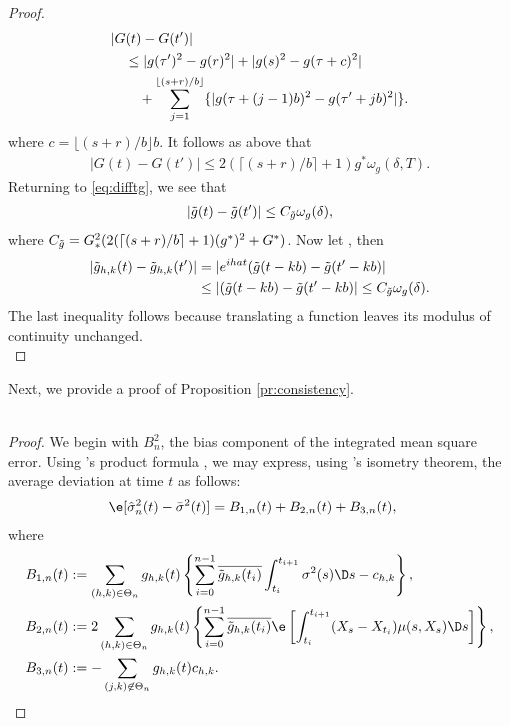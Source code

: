 \begin{appendices}
\begin{proof}
\begin{align}
  &\vert G(t) - G(t') \vert \notag \\
  &\quad \le \vert g(\tau')^2 - g(r)^2\vert +   \vert g(s)^2 - g(\tau + c)^2 \vert\notag \\
  &\qquad +\sum_{j = 1}^{\lfloor (s + r)/b \rfloor} \{\vert g(\tau + (j-1) b)^2 - g(\tau' + j b)^2\vert\}.  \notag
  \label{}
\end{align}
where $c = \lfloor (s + r)/b \rfloor b $. It follows as above that 
\begin{align}
\vert G(t) - G(t') \vert \le 2 (\lceil (s + r)/b\rceil +1)g^*\omega_g(\delta, T).
\end{align}
Returning to \eqref{eq:difftg}, we see that
\begin{align}
  \vert \tilde{g}(t) - \tilde{g}(t')\vert \le C_{\tilde{g}} \omega_g(\delta),\notag
  \label{}
\end{align}
where $C_{\tilde{g}} = G_*^2(2 (\lceil (s + r)/b\rceil +1)(g^*)^2 + G^*)$. Now let \hkints, then
\begin{align}
  \vert \tilde{g}_{h,k}(t) - \tilde{g}_{h,k}(t')\vert & = \vert e^{ihat} (\tilde{g}(t - kb) -\tilde{g}(t'-kb) \vert\notag\\
  &\le \vert (\tilde{g}(t - kb) -\tilde{g}(t'-kb) \vert \le C_{\tilde{g}} \omega_g(\delta).
  \label{}
\end{align}
The last inequality follows because translating a function leaves its modulus of continuity unchanged.\\
\end{proof}
Next, we provide a proof of Proposition \eqref{pr:consistency}. \\\\
\begin{proof}
  We begin with $B^2_n$, the bias component of the integrated mean square error. Using \ito's product formula \citep[p. 257]{Applebaum2009}, we may express, using \ito's isometry theorem, the average deviation at time $t$ as follows:
\begin{align}
  &\e[\svn(t) - \bsv(t)] = B_{1,n}(t) + B_{2,n}(t) + B_{3,n}(t), \notag
\end{align}
where
\begin{align}
  &B_{1,n}(t) :=  \sumt g_{h,k}(t) \left\{\sum_{i=0}^{n-1} \btghki \int_{t_i}^{t_{i+1}}\sigma^2(s) \D s -\chk\right\}, \notag\\
  &B_{2,n}(t) := 2 \sumt g_{h,k}(t)\left\{ \sum_{i=0}^{n-1} \btghki \e\left[\int_{t_i}^{t_{i+1}}(X_s - X_{t_i}) \mu(s,X_s) \D s\right] \right\}, \notag\\
  &B_{3,n}(t) := - \sum_{\substack{(j,k) \not\in \Theta_n }}g_{h,k}(t)\chk. 

\end{align}
\end{proof}
\end{appendices}
